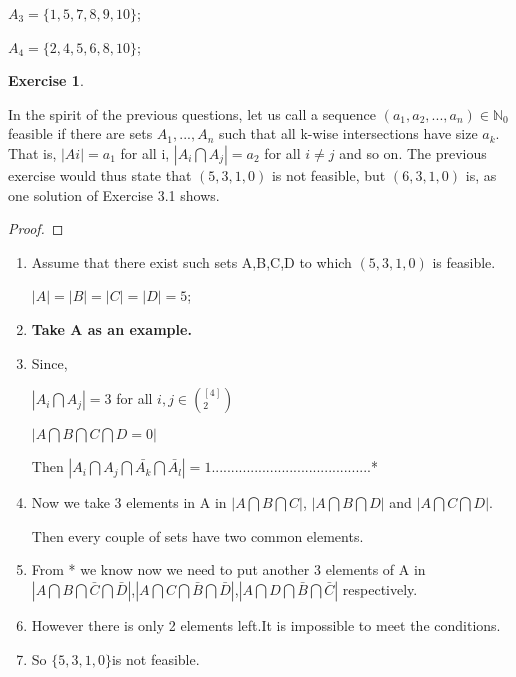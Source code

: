 \documentclass[12pt,a4]{article}
\theoremstyle{exercise}
\newtheorem{exercise}[theorem]{Exercise}
\begin{document}
    $A_3=\{1,5,7,8,9,10\}$;
    
    $A_4=\{2,4,5,6,8,10\}$;
    
\begin{exercise}
\end{exercise}
	In the spirit of the previous questions, let us call a sequence $(a_1,a_2,...,a_n)\in\mathbb{N}_0$ feasible if there are sets $A_1,...,A_n$ such that all k-wise intersections have size $a_k$. That is, $|Ai| = a_{1}$ for all i, $|A_i \bigcap A_j| = a_2$ for all $i \not= j$ and so on. The previous exercise would thus state that $(5, 3, 1, 0)$ is not feasible, but $(6, 3, 1, 0)$ is, as one solution of Exercise 3.1 shows.

\begin{proof}
\end{proof}

\begin{enumerate}
\item Assume that there exist such sets A,B,C,D to which $(5,3,1,0)$ is feasible.

$|A|=|B|=|C|=|D|=5$;


\item \textbf {Take A as an example.}

\item Since,

$|A_i\bigcap A_j| = 3$ for all ${i,j} \in (^{[4]}_{2})$


$|A\bigcap B\bigcap C\bigcap  D = 0|$

Then $|A_i\bigcap A_j \bigcap \bar{A_k}\bigcap \bar{A_l}| = 1$.........................................*

\item Now we take 3 elements in A in $|A\bigcap B\bigcap C|$, $|A\bigcap B\bigcap D|$ and  $|A\bigcap C\bigcap D|$.

Then every couple of sets have two common elements.

\item From * we know now we need to put another 3 elements of A in $|A\bigcap B \bigcap \bar C \bigcap \bar D|$,$|A\bigcap C \bigcap \bar B \bigcap \bar D|$,$|A\bigcap D \bigcap \bar B \bigcap \bar C|$ respectively.

\item However there is only 2 elements left.It is impossible to meet the conditions.

\item So $\{5,3,1,0\}$is not feasible.
\end{enumerate}
\end{document}
